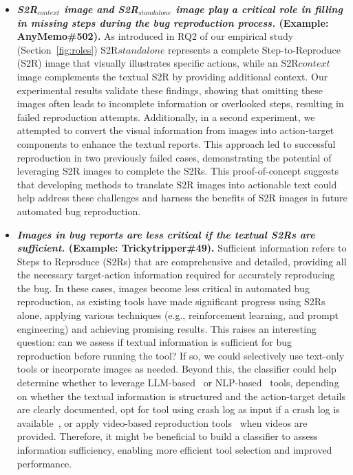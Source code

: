 \begin{itemize}[leftmargin=0.3cm]

\item  
\textbf{\emph{ \textit{S2R$_{context}$ image} and \textit{S2R$_{standalone}$ image} play a critical role in filling in missing steps during the bug reproduction process.} (Example: AnyMemo\#502).} As introduced in RQ2 of our empirical study (Section~\ref{fig:roles}) S2R${standalone}$ represents a complete Step-to-Reproduce (S2R) image that visually illustrates specific actions, while an S2R${context}$ image complements the textual S2R by providing additional context. 
%
Our experimental results validate these findings, showing that omitting these images often leads to incomplete information or overlooked steps, resulting in failed reproduction attempts. 
%
Additionally, in a second experiment, we attempted to convert the visual information from images into action-target components to enhance the textual reports. This approach led to successful reproduction in two previously failed cases, demonstrating the potential of leveraging S2R images to complete the S2Rs. This proof-of-concept suggests that developing methods to translate S2R images into actionable text could help address these challenges and harness the benefits of S2R images in future automated bug reproduction.

%
\item 
\textbf{\emph{Images in bug reports are less critical if the textual S2Rs are sufficient.} (Example: Trickytripper\#49).} 
Sufficient information refers to Steps to Reproduce (S2Rs) that are comprehensive and detailed, providing all the necessary target-action information required for accurately reproducing the bug.
In these cases, images become less critical in automated bug reproduction, as existing tools have made significant progress using S2Rs alone, applying various techniques (e.g., reinforcement learning, and prompt engineering) and achieving promising results. This raises an interesting question: can we assess if textual information is sufficient for bug reproduction before running the tool? If so, we could selectively use text-only tools or incorporate images as needed. Beyond this, the classifier could help determine whether to leverage LLM-based~\cite{wang2024feedback, feng2024prompting} or NLP-based~\cite{zhao2019recdroid} tools, depending on whether the textual information is structured and the action-target details are clearly documented, opt for tool using crash log as input if a crash log is available~\cite{huang2024crashtranslator}, or apply video-based reproduction tools~\cite{feng2022gifdroid} when videos are provided.
%
Therefore, it might be beneficial to build a classifier to assess information sufficiency, enabling more efficient tool selection and improved performance.



\end{itemize}
